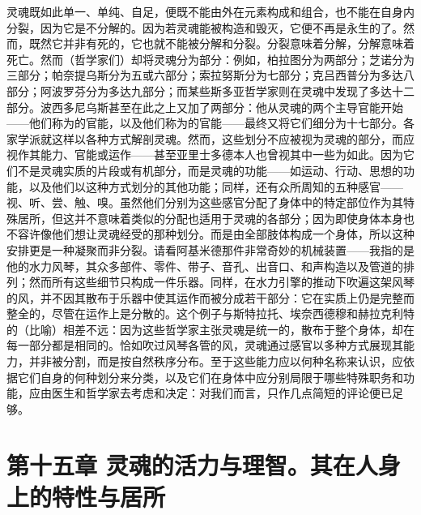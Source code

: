 灵魂既如此单一、单纯、自足，便既不能由外在元素构成和组合，也不能在自身内分裂，因为它是不分解的。因为若灵魂能被构造和毁灭，它便不再是永生的了。然而，既然它并非有死的，它也就不能被分解和分裂。分裂意味着分解，分解意味着死亡。然而（哲学家们）却将灵魂分为部分：例如，柏拉图分为两部分；芝诺分为三部分；帕奈提乌斯分为五或六部分；索拉努斯分为七部分；克吕西普分为多达八部分；阿波罗芬分为多达九部分；而某些斯多亚哲学家则在灵魂中发现了多达十二部分。波西多尼乌斯甚至在此之上又加了两部分：他从灵魂的两个主导官能开始——他们称为的官能，以及他们称为的官能——最终又将它们细分为十七部分。各家学派就这样以各种方式解剖灵魂。然而，这些划分不应被视为灵魂的部分，而应视作其能力、官能或运作——甚至亚里士多德本人也曾视其中一些为如此。因为它们不是灵魂实质的片段或有机部分，而是灵魂的功能——如运动、行动、思想的功能，以及他们以这种方式划分的其他功能；同样，还有众所周知的五种感官——视、听、尝、触、嗅。虽然他们分别为这些感官分配了身体中的特定部位作为其特殊居所，但这并不意味着类似的分配也适用于灵魂的各部分；因为即使身体本身也不容许像他们想让灵魂经受的那种划分。而是由全部肢体构成一个身体，所以这种安排更是一种凝聚而非分裂。请看阿基米德那件非常奇妙的机械装置——我指的是他的水力风琴，其众多部件、零件、带子、音孔、出音口、和声构造以及管道的排列；然而所有这些细节只构成一件乐器。同样，在水力引擎的推动下吹遍这架风琴的风，并不因其散布于乐器中使其运作而被分成若干部分：它在实质上仍是完整而整全的，尽管在运作上是分散的。这个例子与斯特拉托、埃奈西德穆和赫拉克利特的（比喻）相差不远：因为这些哲学家主张灵魂是统一的，散布于整个身体，却在每一部分都是相同的。恰如吹过风琴各管的风，灵魂通过感官以多种方式展现其能力，并非被分割，而是按自然秩序分布。至于这些能力应以何种名称来认识，应依据它们自身的何种划分来分类，以及它们在身体中应分别局限于哪些特殊职务和功能，应由医生和哲学家去考虑和决定：对我们而言，只作几点简短的评论便已足够。\par


\section{第十五章 灵魂的活力与理智。其在人身上的特性与居所}

